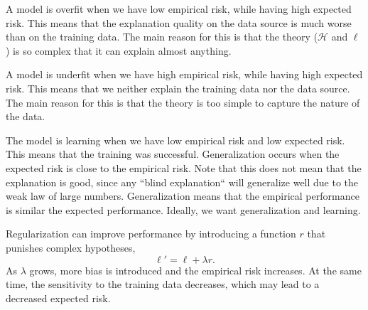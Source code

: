A model is overfit when we have low empirical risk, while having high expected risk. This means
that the explanation quality on the data source is much worse than on the training data. The main
reason for this is that the theory ($\mathcal{H}$ and $\ell$) is so complex that it can explain
almost anything.

A model is underfit when we have high empirical risk, while having high expected risk. This means
that we neither explain the training data nor the data source. The main reason for this is that the
theory is too simple to capture the nature of the data.

The model is learning when we have low empirical risk and low expected risk. This means that the
training was successful. Generalization occurs when the expected risk is close to the empirical
risk. Note that this does not mean that the explanation is good, since any ``blind explanation``
will generalize well due to the weak law of large numbers. Generalization means that the empirical
performance is similar the expected performance. Ideally, we want generalization and learning.

Regularization can improve performance by introducing a function $r$ that punishes complex
hypotheses, \[
    \ell' = \ell + \lambda r.
\]
As $\lambda$ grows, more bias is introduced and the empirical risk increases. At the same time, the
sensitivity to the training data decreases, which may lead to a decreased expected risk.
